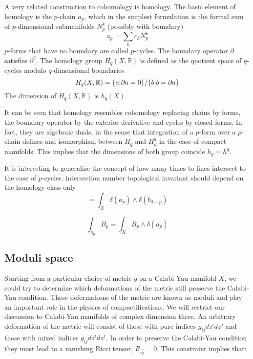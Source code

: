 A very related construction to cohomology is homology.
The basic element of homology is the $p$-chain $a_p$, which in the simplest formulation is the
formal sum of $p$-dimensional submanifolds $N_p^k$ (possibly with boundary)
\begin{equation}
  a_p = \sum_k c_k N_p^k
\end{equation}
$p$-forms that have no boundary are called $p$-cycles. The boundary operator $\partial$ satisfies $\partial^2$.
The homology group $H_q(X,\mathbb R)$ is defined as the quotient space of $q$-cycles modulo $q$-dimensional
boundaries
\begin{equation}
  H_q(X,\mathbb R) =\qty{a| \partial a=0}/\qty{b|b=\partial a}
\end{equation}
The dimension of $H_q(X,\mathbb R)$ is $h_q(X)$.

It can be seen that homology resembles cohomology replacing chains by forms, the boundary operator
by the exterior derivative and cycles by closed forms.
In fact, they are algebraic duals, in the sense that integration of a $p$-form over a $p$-chain
defines and isomorphism between $H_q$ and $H^q_d$ in the case of compact manifolds. 
This implies that the dimensions of both group coincide $h_q=h^q$.

It is interesting to generalize the concept of how many times to lines intersect to the case of
$p$-cycles.
intersection number
topological invariant should depend on the homology class only
\begin{equation}
  [a_p] [b_{d-p}] = \int_X \delta(a_p)\wedge \delta(b_{d-p})
\end{equation}

\begin{equation}
  \int_{a_p} B_p = \int_X B_p \wedge \delta(a_p)
\end{equation}


\subsection{Moduli space}

Starting from a particular choice of metric $g$ on a Calabi-Yau manifold $X$, we could try to determine
which deformations of the metric still preserve the Calabi-Yau condition.
These deformations of the metric are known as moduli and play an important role in the physics of compactifications.
We will restrict our discussion to Calabi-Yau manifolds of complex dimension three.
An arbitrary deformation of the metric will consist of those with pure 
indices $g_{ij}dz^i dz^j$ and those with mixed indices $g_{i\bar j}dz^i dz^{\bar j}$.
In order to preserve the Calabi-Yau condition they must lead to a vanishing Ricci tensor, $R_{i\bar j}=0$.
This constraint implies that:

